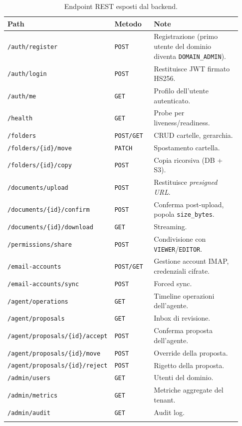\documentclass[11pt,a4paper,oneside]{article}
\begin{document}
\begin{longtable}{p{0.30\linewidth} p{0.18\linewidth} p{0.45\linewidth}}
\toprule
\textbf{Path} & \textbf{Metodo} & \textbf{Note} \\
\midrule
\endhead
\texttt{/auth/register}                      & \texttt{POST}  & Registrazione (primo utente del dominio diventa \texttt{DOMAIN\_ADMIN}). \\
\texttt{/auth/login}                         & \texttt{POST}  & Restituisce JWT firmato HS256. \\
\texttt{/auth/me}                            & \texttt{GET}   & Profilo dell'utente autenticato. \\
\texttt{/health}                             & \texttt{GET}   & Probe per liveness/readiness. \\
\texttt{/folders}                            & \texttt{POST/GET} & CRUD cartelle, gerarchia. \\
\texttt{/folders/\{id\}/move}                & \texttt{PATCH} & Spostamento cartella. \\
\texttt{/folders/\{id\}/copy}                & \texttt{POST}  & Copia ricorsiva (DB + S3). \\
\texttt{/documents/upload}                   & \texttt{POST}  & Restituisce \emph{presigned URL}. \\
\texttt{/documents/\{id\}/confirm}           & \texttt{POST}  & Conferma post-upload, popola \texttt{size\_bytes}. \\
\texttt{/documents/\{id\}/download}          & \texttt{GET}   & Streaming. \\
\texttt{/permissions/share}                  & \texttt{POST}  & Condivisione con \texttt{VIEWER}/\texttt{EDITOR}. \\
\texttt{/email-accounts}                     & \texttt{POST/GET} & Gestione account IMAP, credenziali cifrate. \\
\texttt{/email-accounts/sync}                & \texttt{POST}  & Forced sync. \\
\texttt{/agent/operations}                   & \texttt{GET}   & Timeline operazioni dell'agente. \\
\texttt{/agent/proposals}                    & \texttt{GET}   & Inbox di revisione. \\
\texttt{/agent/proposals/\{id\}/accept}      & \texttt{POST}  & Conferma proposta dell'agente. \\
\texttt{/agent/proposals/\{id\}/move}        & \texttt{POST}  & Override della proposta. \\
\texttt{/agent/proposals/\{id\}/reject}      & \texttt{POST}  & Rigetto della proposta. \\
\texttt{/admin/users}                        & \texttt{GET}   & Utenti del dominio. \\
\texttt{/admin/metrics}                      & \texttt{GET}   & Metriche aggregate del tenant. \\
\texttt{/admin/audit}                        & \texttt{GET}   & Audit log. \\
\bottomrule
\caption{Endpoint REST esposti dal backend.}
\label{tab:endpoints}
\end{longtable}
\end{document}
